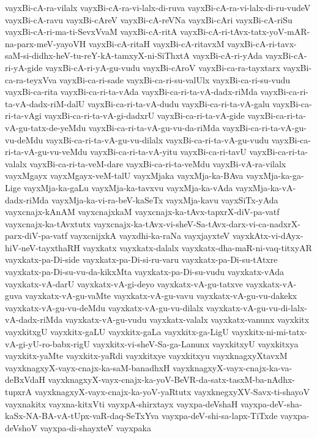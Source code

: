{vayxBi-cA-ra-vilalx
vayxBi-cA-ra-vi-lalx-di-ruva
vayxBi-cA-ra-vi-lalx-di-ru-vudeV
vayxBi-cA-ravu
vayxBi-cAreV
vayxBi-cA-reVNa
vayxBi-cAri
vayxBi-cA-riSu
vayxBi-cA-ri-ma-ti-SevxVvaM
vayxBi-cA-ritA
vayxBi-cA-ri-tAvx-tatx-yoV-mAR-na-parx-meV-yayoVH
vayxBi-cA-ritaH
vayxBi-cA-ritavxM
vayxBi-cA-ri-tavx-saM-si-didhx-heV-tu-reY-kA-tamxyX-ni-SiThxtA
vayxBi-cA-ri-yAda
vayxBi-cA-ri-yA-gide
vayxBi-cA-ri-yA-gu-vudu
vayxBi-cAroV
vayxBi-ca-ra-tayxtarx
vayxBi-ca-ra-teyxVva
vayxBi-ca-ri-sade
vayxBi-ca-ri-su-valUlx
vayxBi-ca-ri-su-vudu
vayxBi-ca-rita
vayxBi-ca-ri-ta-vAda
vayxBi-ca-ri-ta-vA-dadx-riMda
vayxBi-ca-ri-ta-vA-dadx-riM-dalU
vayxBi-ca-ri-ta-vA-dudu
vayxBi-ca-ri-ta-vA-galu
vayxBi-ca-ri-ta-vAgi
vayxBi-ca-ri-ta-vA-gi-dadxrU
vayxBi-ca-ri-ta-vA-gide
vayxBi-ca-ri-ta-vA-gu-tatx-de-yeMdu
vayxBi-ca-ri-ta-vA-gu-vu-da-riMda
vayxBi-ca-ri-ta-vA-gu-vu-deMdu
vayxBi-ca-ri-ta-vA-gu-vu-dilalx
vayxBi-ca-ri-ta-vA-gu-vudu
vayxBi-ca-ri-ta-vA-gu-vu-veMdu
vayxBi-ca-ri-ta-vA-yitu
vayxBi-ca-ri-tavU
vayxBi-ca-ri-ta-valalx
vayxBi-ca-ri-ta-veM-dare
vayxBi-ca-ri-ta-veMdu
vayxBi-vA-ra-vilalx
vayxMgayx
vayxMgayx-veM-talU
vayxMjaka
vayxMja-ka-BAva
vayxMja-ka-ga-Lige
vayxMja-ka-gaLu
vayxMja-ka-tavxvu
vayxMja-ka-vAda
vayxMja-ka-vA-dadx-riMda
vayxMja-ka-vi-ra-beV-kaSeTx
vayxMja-kavu
vayxSiTx-yAda
vayxcnajx-kAnAM
vayxcnajxkaM
vayxcnajx-ka-tAvx-tapxrX-diV-pa-vatf
vayxcnajx-ka-tAvxtutx
vayxcnajx-ka-tAvx-vi-sheV-Sa-tAvx-darx-vi-ca-nadxrX-parx-diV-pa-vatf
vayxcnijxkA
vayxdhi-ka-raNa
vayxjayxteV
vayxkAtx-vi-dAyx-hiV-neV-tayxthaRH
vayxkatx
vayxkatx-dalalx
vayxkatx-dha-maR-ni-vaq-titxyAR
vayxkatx-pa-Di-side
vayxkatx-pa-Di-si-ru-varu
vayxkatx-pa-Di-su-tAtxre
vayxkatx-pa-Di-su-vu-da-kikxMta
vayxkatx-pa-Di-su-vudu
vayxkatx-vAda
vayxkatx-vA-darU
vayxkatx-vA-gi-deyo
vayxkatx-vA-gu-tatxve
vayxkatx-vA-guva
vayxkatx-vA-gu-vaMte
vayxkatx-vA-gu-vavu
vayxkatx-vA-gu-vu-dakekx
vayxkatx-vA-gu-vu-deMdu
vayxkatx-vA-gu-vu-dilalx
vayxkatx-vA-gu-vu-di-lalx-vA-dadx-riMda
vayxkatx-vA-gu-vudu
vayxkatx-valalx
vayxkatx-vanunx
vayxkitx
vayxkitxgU
vayxkitx-gaLU
vayxkitx-gaLa
vayxkitx-ga-LigU
vayxkitx-ni-mi-tatx-vA-gi-yU-ro-babx-rigU
vayxkitx-vi-sheV-Sa-ga-Lanunx
vayxkitxyU
vayxkitxya
vayxkitx-yaMte
vayxkitx-yaRdi
vayxkitxye
vayxkitxyu
vayxknagxyXtavxM
vayxknagxyX-vayx-cnajx-ka-saM-banadhxH
vayxknagxyX-vayx-cnajx-ka-va-deBxVdaH
vayxknagxyX-vayx-cnajx-ka-yoV-BeVR-da-satx-tasxM-ba-nAdhx-tupxrA
vayxknagxyX-vayx-cnajx-ka-yoV-yaRtutx
vayxknegxyXV-Savx-ti-shayoV
vayxnakitx
vayxna-kitxVti
vayxpA-shirxtayx
vayxpa-deVshaH
vayxpa-deV-sha-kaSx-NA-BA-vA-tUpx-vaR-daq-SeTxYva
vayxpa-deV-shi-sa-lapx-TiTxde
vayxpa-deVshoV
vayxpa-di-shayxteV
vayxpaka
}
